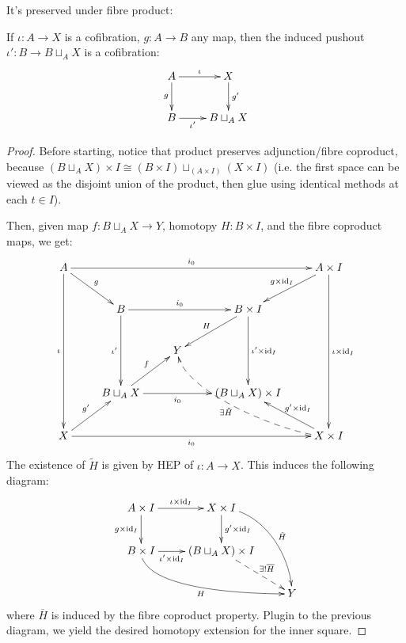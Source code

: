 \documentclass{article}
\begin{document}
It's preserved under fibre product:
\begin{lem}
    If $\iota:A\rightarrow X$ is a cofibration, $g:A\rightarrow B$ any map, then the induced pushout $\iota':B\rightarrow B\sqcup_A X$ is a cofibration:
    \[\xymatrix{
        A \ar[d]_-{g} \ar[r]^-{\iota} & X \ar[d]^-{g'}\\
        B \ar[r]_-{\iota'} & B\sqcup_A X
    }\]
\end{lem}
\begin{proof}
    Before starting, notice that product preserves adjunction/fibre coproduct, because $(B\sqcup_A X)\times I\cong (B\times I)\sqcup_(A\times I) (X\times I)$ (i.e. the first space can be viewed as the disjoint union of the product, then glue using identical methods at each $t\in I$).

    Then, given map $f:B\sqcup_A X\rightarrow Y$, homotopy $H:B\times I$, and the fibre coproduct maps, we get:
    \[\xymatrix{
        A \ar[dr]^-{g} \ar[dddd]_-{\iota} \ar[rrrr]^-{i_0} &&&& A\times I \ar[dddd]^-{\iota\times \id_I} \ar[dl]_-{g\times \id_I}\\
        & B \ar[dd]_-{\iota'} \ar[rr]^-{i_0} && B\times I \ar[dd]^-{\iota'\times \id_I} \ar[dl]_-{H}\\
        && Y\\
        & B\sqcup_A X \ar[ur]^-{f} \ar[rr]_-{i_0} && (B\sqcup_A X)\times I\\
        X \ar[ur]^-{g'} \ar[rrrr]_-{i_0} &&&& X\times I \ar[ul]_-{g'\times \id_I} \ar@{-->}@(l,d)[uull]^-{\exists \tilde{H}}
    }\]
    The existence of $\tilde{H}$ is given by HEP of $\iota:A\rightarrow X$. This induces the following diagram:
    \[\xymatrix{
        A\times I \ar[r]^-{\iota\times \id_I} \ar[d]_-{g\times \id_I} & X\times I \ar[d]^-{g'\times \id_I} \ar@(r,u)[ddr]^-{\tilde{H}}\\
        B\times I \ar@(d,l)[drr]_-{H} \ar[r]_-{\iota'\times \id_I} & (B\sqcup_A X)\times I \ar@{-->}[dr]^-{\exists ! \overline{H}}\\
        && Y
    }\]
    where $\overline{H}$ is induced by the fibre coproduct property. Plugin to the previous diagram, we yield the desired homotopy extension for the inner square.
\end{proof}

\hfil
\end{document}
